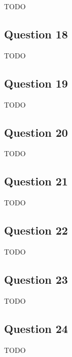 \documentclass[12pt, letterpaper, oneside]{book}
\begin{document}
TODO

\subsection{Question 18}

TODO

\subsection{Question 19}

TODO

\subsection{Question 20}

TODO

\subsection{Question 21}

TODO

\subsection{Question 22}

TODO

\subsection{Question 23}

TODO

\subsection{Question 24}

TODO
\end{document}

